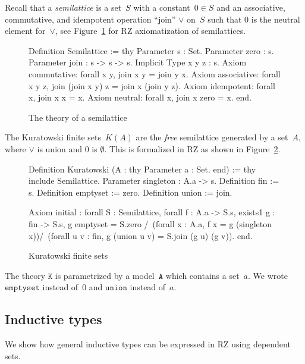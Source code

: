 Recall that a \emph{semilattice} is a set~$S$ with a constant~$0 \in
S$ and an associative, commutative, and idempotent operation ``join''
$\vee$ on~$S$ such that $0$ is the neutral element for~$\vee$, see
Figure~\ref{fig:semilattice} for RZ axiomatization of semilattices.
%
\begin{figure}
  \centering
\begin{source}
Definition Semilattice :=
thy
  Parameter s : Set.
  Parameter zero : s.
  Parameter join : s -> s -> s.
  Implicit Type x y z : s.
  Axiom commutative: forall x y,   join x y = join y x.
  Axiom associative: forall x y z, join (join x y) z = join x (join y z).
  Axiom idempotent:  forall x,     join x x = x.
  Axiom neutral:     forall x,     join x zero = x.
end.
\end{source}
  \caption{The theory of a semilattice}
  \label{fig:semilattice}
\end{figure}
%
The Kuratowski finite sets~$K(A)$ are the \emph{free} semilattice
generated by a set~$A$, where $\vee$ is union and $0$ is $\emptyset$.
This is formalized in RZ as shown in Figure~\ref{fig:kuratowski}.
%
\begin{figure}
\centering
\begin{source}
Definition Kuratowski (A : thy 
                              Parameter a : Set.
                           end) :=
thy
  include Semilattice.
  Parameter singleton : A.a -> s.
  Definition fin := s.
  Definition emptyset := zero.
  Definition union := join.

  Axiom initial :
    forall S : Semilattice, forall f : A.a -> S.s,
    exists1 g : fin -> S.s, 
      g emptyset = S.zero /\
        (forall x : A.a, f x = g (singleton x))/\
        (forall u v : fin, g (union u v) = S.join (g u) (g v)).
end.
\end{source}
  \caption{Kuratowski finite sets}
  \label{fig:kuratowski}
\end{figure}
%
The theory $\mathtt{K}$ is parametrized by a model~$\mathtt{A}$ which
contains a set~$a$. We wrote $\mathtt{emptyset}$ instead of~$0$ and
$\mathtt{union}$ instead of~$a$.



\subsection{Inductive types}
\label{sec:inductive-types}

We show how general inductive types can be expressed in RZ using
dependent sets.

